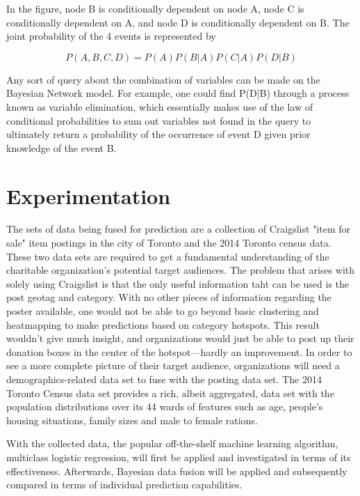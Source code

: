 \documentclass[12pt]{article}
\begin{document}
In the figure, node B is conditionally dependent on node A, node C is conditionally dependent on A, and node D is conditionally dependent on B. The joint probability of the 4 events is represented by 

\[P(A,B,C,D) = P(A)P(B|A)P(C|A)P(D|B)\]

Any sort of query about the combination of variables can be made on the Bayesian Network model. For example, one could find P(D|B) through a process known as variable elimination, which essentially makes use of the law of conditional probabilities to sum out variables not found in the query to ultimately return a probability of the occurrence of event D given prior knowledge of the event B. 

\newpage
\section{Experimentation}
The sets of data being fused for prediction are a collection of Craigslist "item for sale" item postings in the city of Toronto and the 2014 Toronto census data. These two data sets are required to get a fundamental understanding of the charitable organization's potential target audiences. The problem that arises with solely using Craigslist is that the only useful information taht can be used is the post geotag and category. With no other pieces of information regarding the poster available, one would not be able to go beyond basic clustering and heatmapping to make predictions based on category hotspots. This result wouldn't give much insight, and organizations would just be able to post up their donation boxes in the center of the hotspot---hardly an improvement. In order to see a more complete picture of their target audience, organizations will need a demographics-related data set to fuse with the posting data set. The 2014 Toronto Census data set provides a rich, albeit aggregated, data set with the population distributions over its 44 wards of features such as age, people's housing situations, family sizes and male to female rations.

With the collected data, the popular off-the-shelf machine learning algorithm, multiclass logistic regression, will first be applied and investigated in terms of its effectiveness. Afterwards, Bayesian data fusion will be applied and subsequently compared in terms of individual prediction capabilities. 
\end{document}
